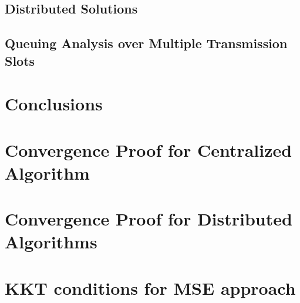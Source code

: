 \documentclass[10pt,journal,twocolumn,letterpaper]{./../Styles/IEEEtran}
\begin{document}
\subsection{Distributed Solutions} \label{sec-5.2}


\subsection{Queuing Analysis over Multiple Transmission Slots} \label{time-correlated}
\review{}

\section{Conclusions} \label{sec-6}





\clearpage

\appendices

%

%

\section{Convergence Proof for Centralized Algorithm} \label{sec-3.5}


\section{Convergence Proof for Distributed Algorithms} \label{sec-dist-conv}


\section{\ac{KKT} conditions for \ac{MSE} approach} \label{a-1}

\end{document}
